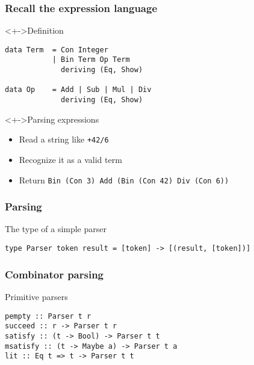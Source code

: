 \documentclass{beamer}
\subtitle
{Parsing}
\begin{document}
\begin{frame}
  \titlepage
\end{frame}



\begin{frame}[fragile]
  \frametitle{Recall the expression language}
\begin{block}<+->{Definition}
\begin{lstlisting}
data Term  = Con Integer
           | Bin Term Op Term  
             deriving (Eq, Show)
           
data Op    = Add | Sub | Mul | Div
             deriving (Eq, Show)
\end{lstlisting}
\end{block}
\begin{alertblock}<+->{Parsing expressions}
  \begin{itemize}
  \item Read a string like \texttt{+42/6\dq}
  \item Recognize it as a valid term
  \item Return \texttt{Bin (Con 3) Add (Bin (Con 42) Div (Con 6))} 
  \end{itemize}
\end{alertblock}
\end{frame}             

\begin{frame}[fragile]
  \frametitle{Parsing}
\begin{block}{The type of a simple parser}
\begin{lstlisting}
type Parser token result = [token] -> [(result, [token])]
\end{lstlisting}  
\end{block}
\end{frame}             

\begin{frame}[fragile]
  \frametitle{Combinator parsing}
  \begin{block}{Primitive parsers}
\begin{lstlisting}
pempty :: Parser t r
succeed :: r -> Parser t r
satisfy :: (t -> Bool) -> Parser t t
msatisfy :: (t -> Maybe a) -> Parser t a
lit :: Eq t => t -> Parser t t
\end{lstlisting}
  \end{block}
\end{frame}
\end{document}
